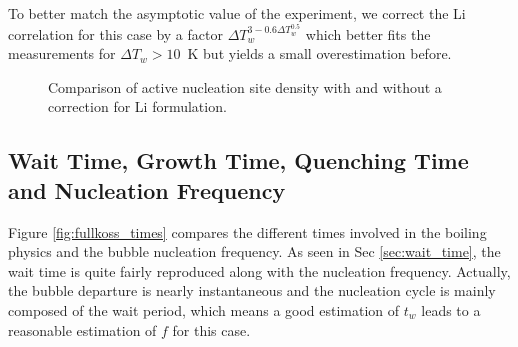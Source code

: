 \npar

To better match the asymptotic value of the experiment, we correct the Li \etal correlation for this case by a factor $\Delta T_{w}^{3-0.6\Delta T_{w}^{0.5}}$ which better fits the measurements for $\Delta T_{w}>10$~K but yields a small overestimation before.


\begin{figure}[!h]
\caption{Comparison of active nucleation site density with and without a correction for Li \etal formulation.}
\label{fig:fullkoss_nsit}
\end{figure}



\subsection{Wait Time, Growth Time, Quenching Time and Nucleation Frequency}

Figure \ref{fig:fullkoss_times} compares the different times involved in the boiling physics and the bubble nucleation frequency. As seen in Sec \ref{sec:wait_time}, the wait time is quite fairly reproduced along with the nucleation frequency. Actually, the bubble departure is nearly instantaneous and the nucleation cycle is mainly composed of the wait period, which means a good estimation of $t_{w}$ leads to a reasonable estimation of $f$ for this case.

